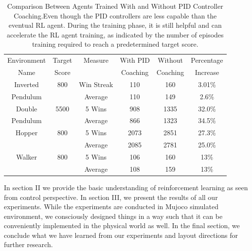 \documentclass[journal]{IEEEtran}
\begin{document}
\begin{table}
\scriptsize

\caption{Comparison Between Agents Trained With and Without PID Controller Coaching.Even though the PID controllers are less capable than the eventual RL agent. During the training phase, it is still helpful and can accelerate the RL agent training, as indicated by the number of episodes training required to reach a predetermined target score.}
\label{episode_compare}
\centering
\begin{tabular}{ cccccc }
\rowcolor{airforceblue}

Environment & Target & Measure  &  With PID  & Without  & Percentage\\
\rowcolor{airforceblue}

   Name     & Score  &              & Coaching  & Coaching  & Increase \\
\hline
Inverted & 800& Win Streak & 110 & 160&  3.01\% \\
Pendulum & &Average  & 110 &  149&  2.6\%\\
\rowcolor{beaublue}
Double & 5500& 5 Wins & 908 & 1335&  32.0\%\\
\rowcolor{beaublue}
Pendulum & &Average & 866 &  1323&  34.5\%\\
Hopper & 800& 5 Wins & 2073 & 2851&  27.3\%\\
       & &Average  & 2085 &  2781&  25.0\%\\
\rowcolor{beaublue}
Walker & 800& 5 Wins & 106 & 160&  13\%\\
\rowcolor{beaublue}
       & &Average  & 108 &  159&  13\%\\

\end{tabular}
\end{table}



In section II we provide the basic understanding of reinforcement learning as seen from control perspective. In section III, we present the results of all our experiments. While the experiments are conducted in Mujoco simulated environment, we consciously designed things in a way such that it can be conveniently implemented in the physical world as well. In the final section, we conclude what we have learned from our experiments and layout directions for further research.
\end{document}
